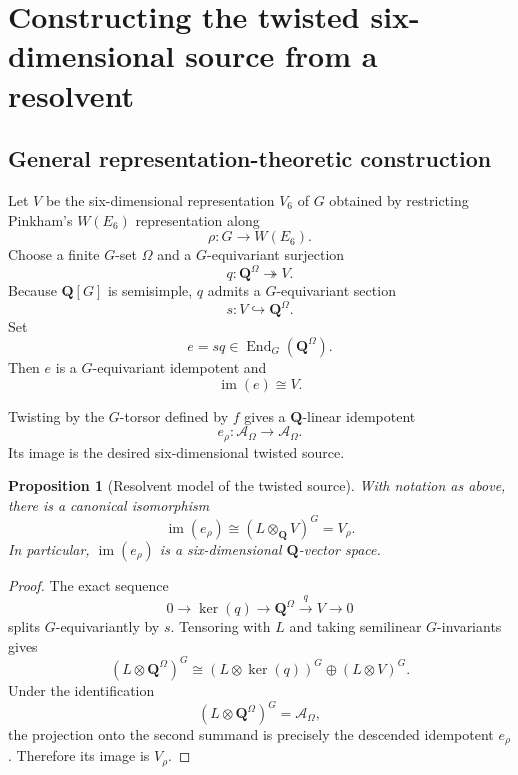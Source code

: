 \documentclass[11pt]{article}
\newcommand{\QQ}{\mathbf{Q}}
\newcommand{\End}{\operatorname{End}}
\newcommand{\im}{\operatorname{im}}
\newcommand{\cA}{\mathcal{A}}
\newcommand{\W}{W(E_6)}
\newcommand{\V}{V_6}
\newtheorem{proposition}[definition]{Proposition}
\begin{document}
\section{Constructing the twisted six-dimensional source from a resolvent}

\subsection{General representation-theoretic construction}

Let $V$ be the six-dimensional representation $\V$ of $G$ obtained by restricting
Pinkham's $W(E_6)$ representation along
\[
  \rho:G\to\W.
\]
Choose a finite $G$-set $\Omega$ and a $G$-equivariant surjection
\begin{equation}
  q:\QQ^\Omega\twoheadrightarrow V.
  \label{eq:qOmega}
\end{equation}
Because $\QQ[G]$ is semisimple, $q$ admits a $G$-equivariant section
\begin{equation}
  s:V\hookrightarrow \QQ^\Omega.
  \label{eq:section}
\end{equation}
Set
\begin{equation}
  e=sq\in\End_G(\QQ^\Omega).
  \label{eq:idempotent}
\end{equation}
Then $e$ is a $G$-equivariant idempotent and
\[
  \im(e)\cong V.
\]

Twisting by the $G$-torsor defined by $f$ gives a $\QQ$-linear idempotent
\begin{equation}
  e_\rho:\cA_\Omega\longrightarrow\cA_\Omega.
  \label{eq:descended-idempotent}
\end{equation}
Its image is the desired six-dimensional twisted source.

\begin{proposition}[Resolvent model of the twisted source]
With notation as above, there is a canonical isomorphism
\begin{equation}
  \im(e_\rho)\cong (L\otimes_\QQ V)^G=V_\rho.
  \label{eq:source-as-image}
\end{equation}
In particular, $\im(e_\rho)$ is a six-dimensional $\QQ$-vector space.
\end{proposition}

\begin{proof}
The exact sequence
\[
  0\longrightarrow\ker(q)\longrightarrow \QQ^\Omega
  \xrightarrow{q}V\longrightarrow0
\]
splits $G$-equivariantly by $s$.  Tensoring with $L$ and taking semilinear
$G$-invariants gives
\[
  (L\otimes\QQ^\Omega)^G
  \cong
  (L\otimes\ker(q))^G\oplus (L\otimes V)^G.
\]
Under the identification
\[
  (L\otimes\QQ^\Omega)^G=\cA_\Omega,
\]
the projection onto the second summand is precisely the descended idempotent
$e_\rho$.  Therefore its image is $V_\rho$.
\end{proof}
\end{document}
